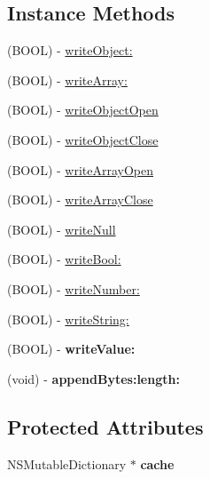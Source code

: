 \subsection*{Instance Methods}
\begin{DoxyCompactItemize}
\item 
(B\-O\-O\-L) -\/ \hyperlink{interface_s_b_json_stream_writer_a561990f7d890ffdafdc3f682cacc7211}{write\-Object\-:}
\item 
(B\-O\-O\-L) -\/ \hyperlink{interface_s_b_json_stream_writer_a781a94592da7317105844dfc8c6706cc}{write\-Array\-:}
\item 
(B\-O\-O\-L) -\/ \hyperlink{interface_s_b_json_stream_writer_ab9ff056f3f9f3ad5614163bcf194bbec}{write\-Object\-Open}
\item 
(B\-O\-O\-L) -\/ \hyperlink{interface_s_b_json_stream_writer_a5d5dae8a7c4c4bf8dd2780afa68cd251}{write\-Object\-Close}
\item 
(B\-O\-O\-L) -\/ \hyperlink{interface_s_b_json_stream_writer_aafa9f94cb852d1feda150e327ead8214}{write\-Array\-Open}
\item 
(B\-O\-O\-L) -\/ \hyperlink{interface_s_b_json_stream_writer_afc0ed996a7782780750202e639ce9846}{write\-Array\-Close}
\item 
(B\-O\-O\-L) -\/ \hyperlink{interface_s_b_json_stream_writer_a1e8475e49f5d0077d24c270e733f1841}{write\-Null}
\item 
(B\-O\-O\-L) -\/ \hyperlink{interface_s_b_json_stream_writer_ae15932d9181ad5276806adad55c7dc53}{write\-Bool\-:}
\item 
(B\-O\-O\-L) -\/ \hyperlink{interface_s_b_json_stream_writer_a888ca10428bf36470a4abe767cbec6e3}{write\-Number\-:}
\item 
(B\-O\-O\-L) -\/ \hyperlink{interface_s_b_json_stream_writer_a9acd747325bacc643f4830619d4c1139}{write\-String\-:}
\item 
\hypertarget{interface_s_b_json_stream_writer_ad07ba844e4c471660daf9b5dfcb43e8e}{(B\-O\-O\-L) -\/ {\bfseries write\-Value\-:}}\label{interface_s_b_json_stream_writer_ad07ba844e4c471660daf9b5dfcb43e8e}

\item 
\hypertarget{interface_s_b_json_stream_writer_a27c7af220a32b2dedd15106e435a7df9}{(void) -\/ {\bfseries append\-Bytes\-:length\-:}}\label{interface_s_b_json_stream_writer_a27c7af220a32b2dedd15106e435a7df9}

\end{DoxyCompactItemize}
\subsection*{Protected Attributes}
\begin{DoxyCompactItemize}
\item 
\hypertarget{interface_s_b_json_stream_writer_a6ffa204ce430d6d2d6566d3267ccf085}{N\-S\-Mutable\-Dictionary $\ast$ {\bfseries cache}}\label{interface_s_b_json_stream_writer_a6ffa204ce430d6d2d6566d3267ccf085}

\end{DoxyCompactItemize}
